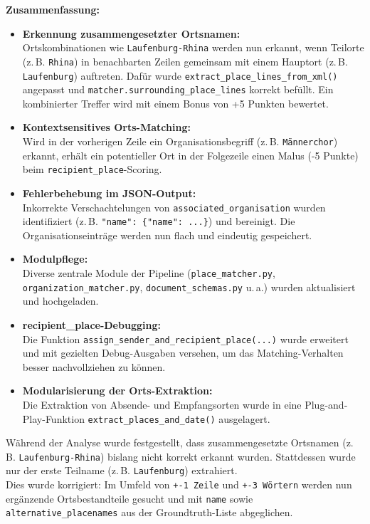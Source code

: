 \documentclass{article}
\begin{document}
\vspace{0.5em}
\noindent\textbf{Zusammenfassung:}
\begin{itemize}
    \item \textbf{Erkennung zusammengesetzter Ortsnamen:} \\
    Ortskombinationen wie \texttt{Laufenburg-Rhina} werden nun erkannt, wenn Teilorte (z.\,B. \texttt{Rhina}) in benachbarten Zeilen gemeinsam mit einem Hauptort (z.\,B. \texttt{Laufenburg}) auftreten. Dafür wurde \texttt{extract\_place\_lines\_from\_xml()} angepasst und \texttt{matcher.surrounding\_place\_lines} korrekt befüllt. Ein kombinierter Treffer wird mit einem Bonus von +5 Punkten bewertet.
    
    \item \textbf{Kontextsensitives Orts-Matching:} \\
    Wird in der vorherigen Zeile ein Organisationsbegriff (z.\,B. \texttt{Männerchor}) erkannt, erhält ein potentieller Ort in der Folgezeile einen Malus (-5 Punkte) beim \texttt{recipient\_place}-Scoring.
    
    \item \textbf{Fehlerbehebung im JSON-Output:} \\
    Inkorrekte Verschachtelungen von \texttt{associated\_organisation} wurden identifiziert (z.\,B. \texttt{"name": \{"name": ...\}}) und bereinigt. Die Organisationseinträge werden nun flach und eindeutig gespeichert.
    
    \item \textbf{Modulpflege:} \\
    Diverse zentrale Module der Pipeline (\texttt{place\_matcher.py}, \texttt{organization\_matcher.py}, \texttt{document\_schemas.py} u.\,a.) wurden aktualisiert und hochgeladen.
    
    \item \textbf{recipient\_place-Debugging:} \\
    Die Funktion \texttt{assign\_sender\_and\_recipient\_place(...)} wurde erweitert und mit gezielten Debug-Ausgaben versehen, um das Matching-Verhalten besser nachvollziehen zu können.
    
    \item \textbf{Modularisierung der Orts-Extraktion:} \\
    Die Extraktion von Absende- und Empfangsorten wurde in eine Plug-and-Play-Funktion \texttt{extract\_places\_and\_date()} ausgelagert.
\end{itemize}

\vspace{0.5em}
\noindent Während der Analyse wurde festgestellt, dass zusammengesetzte Ortsnamen (z.\,B. \texttt{Laufenburg-Rhina}) bislang nicht korrekt erkannt wurden. Stattdessen wurde nur der erste Teilname (z.\,B. \texttt{Laufenburg}) extrahiert.\\
Dies wurde korrigiert: Im Umfeld von \texttt{+-1 Zeile} und \texttt{+-3 Wörtern} werden nun ergänzende Ortsbestandteile gesucht und mit \texttt{name} sowie \texttt{alternative\_placenames} aus der Groundtruth-Liste abgeglichen.\\
\end{document}

